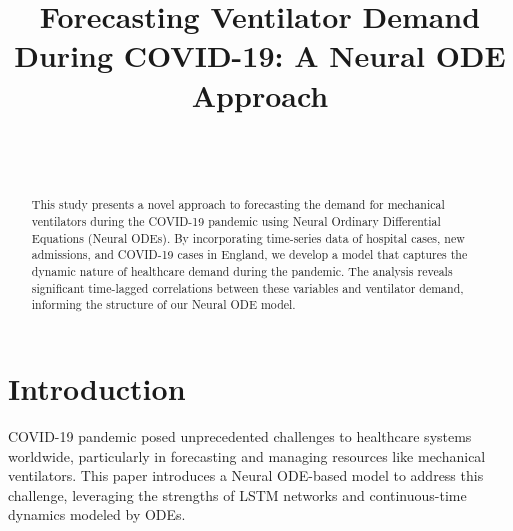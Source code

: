 \documentclass[lettersize, journal]{IEEEtran}
\begin{document}
\title{Forecasting Ventilator Demand During COVID-19: A Neural ODE Approach}

\author{
    \\
    \\
}
\maketitle

\begin{abstract}
    This study presents a novel approach to forecasting the demand for mechanical ventilators during the COVID-19 pandemic using Neural Ordinary Differential Equations (Neural ODEs). By incorporating time-series data of hospital cases, new admissions, and COVID-19 cases in England, we develop a model that captures the dynamic nature of healthcare demand during the pandemic. The analysis reveals significant time-lagged correlations between these variables and ventilator demand, informing the structure of our Neural ODE model.
\end{abstract}

\section{Introduction}
 COVID-19 pandemic posed unprecedented challenges to healthcare systems worldwide, particularly in forecasting and managing resources like mechanical ventilators. This paper introduces a Neural ODE-based model to address this challenge, leveraging the strengths of LSTM networks and continuous-time dynamics modeled by ODEs.
\end{document}
